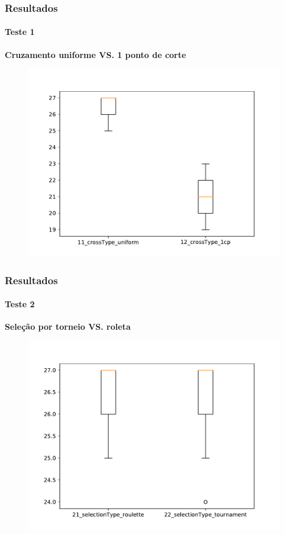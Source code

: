 \documentclass{beamer}
\begin{document}
	\begin{frame}
		\frametitle{Resultados}
		\framesubtitle{Teste 1}
		\textbf{Cruzamento uniforme VS. 1 ponto de corte}
		\begin{figure}[H]
			\includegraphics[scale=0.5]{../relatorio/teste1.pdf}
		\end{figure}
	\end{frame}
	
	\begin{frame}
		\frametitle{Resultados}
		\framesubtitle{Teste 2}
		\textbf{Seleção por torneio VS. roleta}
		\begin{figure}[H]
			\includegraphics[scale=0.5]{../relatorio/teste2.pdf}
		\end{figure}
	\end{frame}
	
\end{document}
